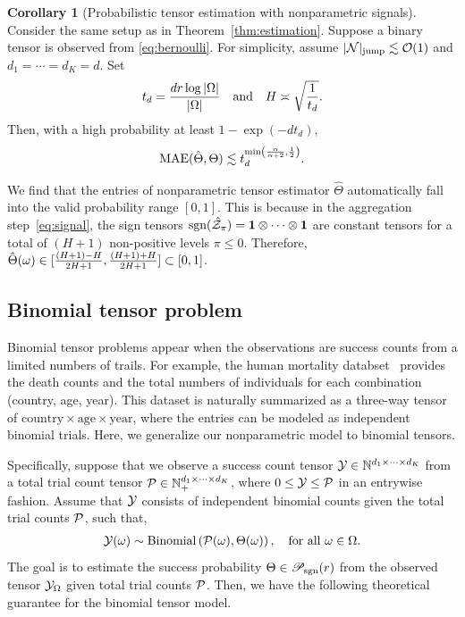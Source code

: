 \documentclass[twoside,11pt]{article}
\theoremstyle{definition}
\newtheorem{cor}{Corollary}
\def\sign{\textup{sgn}}
\def\caliP{\mathscr{P}_{\textup{sgn}}}
\begin{document}
\begin{cor}[Probabilistic tensor estimation with nonparametric signals]\label{thm:bernoulli}
Consider the same setup as in Theorem~\ref{thm:estimation}. Suppose a binary tensor is observed from \eqref{eq:bernoulli}. 
For simplicity, assume $|\mathcal{N}|_{\text{jump}}\lesssim \mathcal{O}(1)$ and $d_1=\cdots =d_K=d$. Set
\[
t_d ={d r \log |\Omega|\over |\Omega|} \quad \text{and}\quad H\asymp \sqrt{1\over t_d}.
\] 
Then, with a high probability at least $1-\exp(-d t_d)$,
\begin{equation}\label{eq:bound4}
\textup{MAE}(\hat \Theta, \Theta)\lesssim t_d^{\min\left({\alpha\over \alpha+2}, {1\over 2}\right)}.
\end{equation}
\end{cor}
We find that the entries of nonparametric tensor estimator $\hat \Theta$ automatically fall into the valid probability range $[0,1]$. This is because in the aggregation step~\eqref{eq:signal}, the sign tensors $\sign(\hat \tZ_\pi)=\mathbf{1}\otimes \cdots \otimes \mathbf{1}$ are constant tensors for a total of $(H+1)$ non-positive levels $\pi\leq 0$. Therefore, $\hat \Theta(\omega) \in [{(H+1)-H\over 2H+1}, {(H+1)+H\over 2H+1}]\subset [0,1]$.

\subsection{Binomial tensor problem} 

Binomial tensor problems appear when the observations are success counts from a limited numbers of trails. For example, the human mortality databset~\citep{jdanov2019human} provides the death counts and the total numbers of individuals for each combination (country, age, year). This dataset is naturally summarized as a three-way tensor of $\text{country}\times\text{age}\times\text{year}$, where the entries can be modeled as independent binomial trials. Here, we generalize our nonparametric model to binomial tensors.

Specifically, suppose that we observe a success count tensor $\mathcal{Y}\in\mathbb{N}^{d_1\times\cdots\times d_K}$ from a total trial count tensor $\mathcal{P}\in\mathbb{N}_{+}^{d_1\times \cdots\times d_K}$, where $0\leq \mathcal{Y}\leq \mathcal{P}$ in an entrywise fashion. Assume that $\mathcal{Y}$ consists of independent binomial counts given the total trial counts $\mathcal{P}$, such that,
\begin{align}
\label{eq:binom}
    \mathcal{Y}(\omega) \sim \text{Binomial}\left(\mathcal{P}(\omega),\Theta(\omega)\right), \quad \text{for all } \omega\in\Omega. 
\end{align}
The goal is to estimate the success probability $\Theta\in\caliP(r)$ from the observed tensor $\mathcal{Y}_\Omega$ given total trial counts $\mathcal{P}$. Then, we have the following theoretical guarantee for the binomial tensor model.
\end{document}
